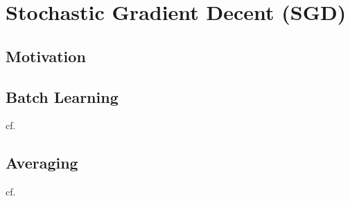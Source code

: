 
\chapter{Stochastic Gradient Decent (SGD)}

\section{Motivation}

\section{Batch Learning}

cf. \cite{hardtTrainFasterGeneralize2016} \cite{hofferTrainLongerGeneralize2018}

\section{Averaging}

cf. \cite{bachNonstronglyconvexSmoothStochastic2013}


\endinput

